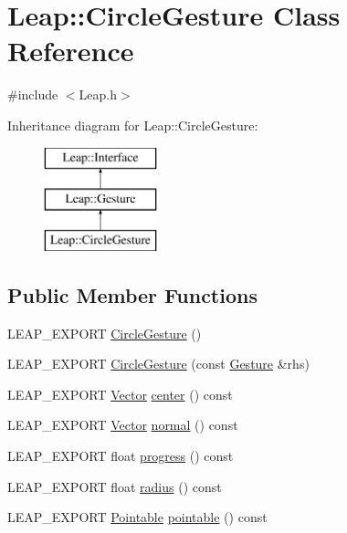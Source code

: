 \hypertarget{class_leap_1_1_circle_gesture}{\section{Leap\+:\+:Circle\+Gesture Class Reference}
\label{class_leap_1_1_circle_gesture}
}


{\ttfamily \#include $<$Leap.\+h$>$}

Inheritance diagram for Leap\+:\+:Circle\+Gesture\+:\begin{figure}[H]
\begin{center}
\leavevmode
\includegraphics[height=3.000000cm]{class_leap_1_1_circle_gesture}
\end{center}
\end{figure}
\subsection*{Public Member Functions}
\begin{DoxyCompactItemize}
\item 
L\+E\+A\+P\+\_\+\+E\+X\+P\+O\+R\+T \hyperlink{class_leap_1_1_circle_gesture_a67ac2907b68958693129eb7a6f731722}{Circle\+Gesture} ()
\item 
L\+E\+A\+P\+\_\+\+E\+X\+P\+O\+R\+T \hyperlink{class_leap_1_1_circle_gesture_a3a27444e1657e1ecf3e74bc9c7cad292}{Circle\+Gesture} (const \hyperlink{class_leap_1_1_gesture}{Gesture} \&rhs)
\item 
L\+E\+A\+P\+\_\+\+E\+X\+P\+O\+R\+T \hyperlink{struct_leap_1_1_vector}{Vector} \hyperlink{class_leap_1_1_circle_gesture_aa6f358e771078c056dea579511707784}{center} () const 
\item 
L\+E\+A\+P\+\_\+\+E\+X\+P\+O\+R\+T \hyperlink{struct_leap_1_1_vector}{Vector} \hyperlink{class_leap_1_1_circle_gesture_ae0fbdb4a8905e289afa885c2f304ae52}{normal} () const 
\item 
L\+E\+A\+P\+\_\+\+E\+X\+P\+O\+R\+T float \hyperlink{class_leap_1_1_circle_gesture_a6117b3ab528b6af6ae2d76b1afa03110}{progress} () const 
\item 
L\+E\+A\+P\+\_\+\+E\+X\+P\+O\+R\+T float \hyperlink{class_leap_1_1_circle_gesture_a25b6f377b953f82c4d0c2a7488c02253}{radius} () const 
\item 
L\+E\+A\+P\+\_\+\+E\+X\+P\+O\+R\+T \hyperlink{class_leap_1_1_pointable}{Pointable} \hyperlink{class_leap_1_1_circle_gesture_adc211d647af2a5853773dbabf5deb1ab}{pointable} () const 
\end{DoxyCompactItemize}
